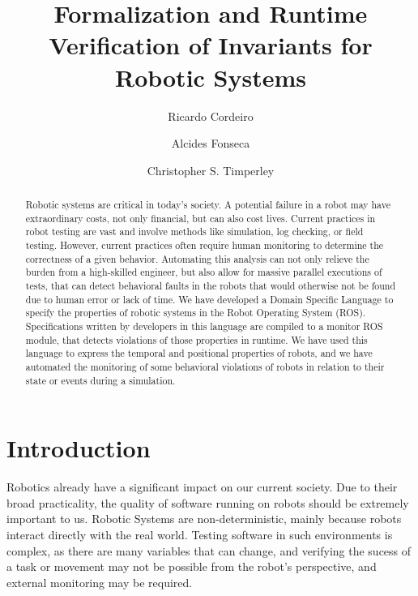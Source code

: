 \documentclass[runningheads]{llncs}
\begin{document}
%
\title{Formalization and Runtime Verification of Invariants for
Robotic Systems}
%
%
\author{Ricardo Cordeiro \and
Alcides Fonseca \and
Christopher S. Timperley}
%
%
%
\maketitle              %
%
\begin{abstract}
    Robotic systems are critical in today's society. A potential failure in a robot may have extraordinary costs, not only financial, but can also cost lives.
    Current practices in robot testing are vast and involve methods like simulation, log checking, or field testing. However, current practices often require human monitoring to determine the correctness of a given behavior. Automating this analysis can not only relieve the burden from a high-skilled engineer, but also allow for massive parallel executions of tests, that can detect behavioral faults in the robots that would otherwise not be found due to human error or lack of time.
    We have developed a Domain Specific Language to specify the properties of robotic systems in the Robot Operating System (ROS). Specifications written by developers in this language are compiled to a monitor ROS module, that detects violations of those properties in runtime. We have used this language to express the temporal and positional properties of robots, and we have automated the monitoring of some behavioral violations of robots in relation to their state or events during a simulation.

\end{abstract}
%
%
%
\section{Introduction}

Robotics already have a significant impact on our current society. Due to their broad practicality, the quality of software running on robots should be extremely important to us. Robotic Systems are non-deterministic, mainly because robots interact directly with the real world. Testing software in such environments is complex, as there are many variables that can change, and verifying the sucess of a task or movement may not be possible from the robot's perspective, and external monitoring may be required.
\end{document}
